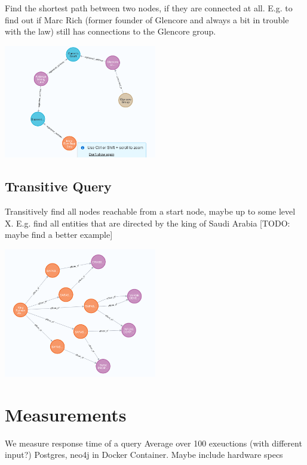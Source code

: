 \documentclass[11pt, a4paper,oneside,chapterprefix=false]{scrbook}
\begin{document}
Find the shortest path between two nodes, if they are connected at all. E.g. to find out if Marc Rich (former founder of Glencore and always a bit in trouble with the law) still has connections to the Glencore group.

\includegraphics*[width=0.5\textwidth]{figures/query_shortest_path.png} \hfill

\subsection{Transitive Query}

Transitively find all nodes reachable from a start node, maybe up to some level X. E.g. find all entities that are directed by the king of Saudi Arabia [TODO: maybe find a better example]

\includegraphics*[width=0.5\textwidth]{figures/query_transitive.png} \hfill


\section{Measurements} \label{sec:measurements}

We measure response time of a query
Average over 100 exeuctions (with different input?)
Postgres, neo4j in Docker Container. Maybe include hardware specs
\end{document}
